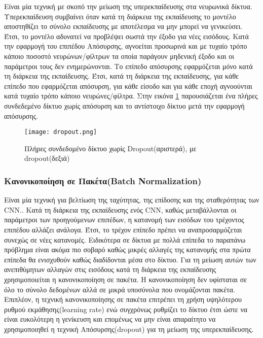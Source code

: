 Είναι μία τεχνική με σκοπό την μείωση της υπερεκπαίδευσης στα νευρωνικά δίκτυα. Υπερεκπαίδευση συμβαίνει όταν κατά τη διάρκεια της εκπαίδευσης το μοντέλο αποστηθίζει το σύνολο εκπαίδευσης με αποτέλεσμα να μην μπορεί να γενικεύσει. Έτσι, το μοντέλο αδυνατεί να προβλέψει σωστά την έξοδο για νέες εισόδους.
Κατά την εφαρμογή του επιπέδου Απόσυρσης, αγνοείται προσωρινά και με τυχαίο τρόπο κάποιο ποσοστό νευρώνων/φίλτρων τα οποία παράγουν μηδενική έξοδο και οι παράμετροι τους δεν ενημερώνονται. Το επίπεδο απόσυρσης εφαρμόζεται μόνο κατά τη διάρκεια της εκπαίδευσης. Έτσι, κατά τη διάρκεια της εκπαίδευσης, για κάθε επίπεδο που εφαρμόζεται απόσυρση, για κάθε είσοδο και για κάθε εποχή αγνοούνται κατά τυχαίο τρόπο κάποιο νευρώνες/φίλτρα. Στην εικόνα \ref{figure:dropout} παρουσιάζεται ένα πλήρες συνδεδεμένο δίκτυο χωρίς απόσυρση και το αντίστοιχο δίκτυο μετά την εφαρμογή απόσυρσης.


\begin{figure}[!h]
    \centering
      \texttt{[image: dropout.png]} \caption{Πλήρες συνδεδομένο δίκτυο χωρίς Dropout(αριστερά), με dropout(δεξιά)}
      \label{figure:dropout}    
  \end{figure}


\subsubsection{Κανονικοποίηση σε Πακέτα(Batch Normalization)}
\label{subsubsec:3.1.3.8}

Είναι μία τεχνική για βελτίωση της ταχύτητας, της επίδοσης και της σταθερότητας των CNN.\cite{BN}. Κατά τη διάρκεια της εκπαίδευσης ενός CNN, καθώς μεταβάλλονται οι παράμετροι των προηγούμενων επιπέδων, η κατανομή των εισόδων του τρέχοντος επιπέδου αλλάζει ανάλογα. Έτσι, το τρέχον επίπεδο πρέπει να αναπροσαρμόζεται συνεχώς σε νέες κατανομές. Ειδικότερα σε δίκτυα με πολλά επίπεδα το παραπάνω πρόβλημα είναι ακόμα πιο σοβαρό καθώς μικρές αλλαγές της κατανομής στα πρώτα επίπεδα θα ενισχυθούν καθώς διαδίδονται μέσα στο δίκτυο. Για τη μείωση αυτών των ανεπιθύμητων αλλαγών στις εισόδους κατά τη διάρκεια της εκπαίδευσης χρησιμοποιείται η κανονικοποίηση σε πακέτα. Η κανονικοποίηση δεν υφίσταται σε όλο το σύνολο δεδομένων αλλά σε μικρά υποσύνολα που ονομάζονται πακέτα. Επιπλέον, η τεχνική κανονικοποίησης σε πακέτα επιτρέπει τη χρήση υψηλότερου ρυθμού εκμάθησης(learning rate) ενώ συγχρόνως ρυθμίζει το δίκτυο έτσι ώστε να είναι ευκολότερη η γενίκευση και επομένως να μην είναι απαραίτητο να χρησιμοποιηθεί η τεχνική Απόσυρσης(dropout) για τη μείωση της υπερεκπαίδευσης.



